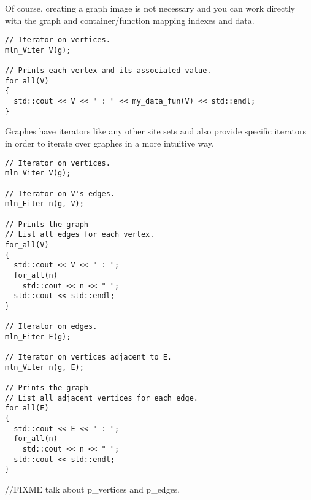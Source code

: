 \documentclass{report}
\begin{document}
Of course, creating a graph image is not necessary and you can work directly
with the graph and container/function mapping indexes and data.

\begin{lstlisting}
// Iterator on vertices.
mln_Viter V(g);

// Prints each vertex and its associated value.
for_all(V)
{
  std::cout << V << " : " << my_data_fun(V) << std::endl;
}
\end{lstlisting}

Graphes have iterators like any other site sets and also provide
specific iterators in order to iterate over graphes in a more intuitive way.

\begin{lstlisting}
// Iterator on vertices.
mln_Viter V(g);

// Iterator on V's edges.
mln_Eiter n(g, V);

// Prints the graph
// List all edges for each vertex.
for_all(V)
{
  std::cout << V << " : ";
  for_all(n)
    std::cout << n << " ";
  std::cout << std::endl;
}

// Iterator on edges.
mln_Eiter E(g);

// Iterator on vertices adjacent to E.
mln_Viter n(g, E);

// Prints the graph
// List all adjacent vertices for each edge.
for_all(E)
{
  std::cout << E << " : ";
  for_all(n)
    std::cout << n << " ";
  std::cout << std::endl;
}
\end{lstlisting}

//FIXME talk about p_vertices and p_edges.
\end{document}
